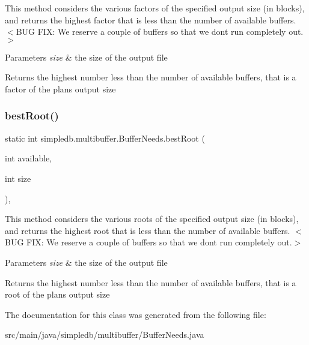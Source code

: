 This method considers the various factors of the specified output size (in blocks), and returns the highest factor that is less than the number of available buffers. $<$B\+UG F\+IX\+: We reserve a couple of buffers so that we don\textquotesingle{}t run completely out.$>$ 
\begin{DoxyParams}{Parameters}
{\em size} & the size of the output file \\
\hline
\end{DoxyParams}
\begin{DoxyReturn}{Returns}
the highest number less than the number of available buffers, that is a factor of the plan\textquotesingle{}s output size 
\end{DoxyReturn}
\mbox{\label{classsimpledb_1_1multibuffer_1_1BufferNeeds_ab3eff09df8f5c079b69df4a2939d7545}} 
\subsubsection{\texorpdfstring{best\+Root()}{bestRoot()}}
{\footnotesize\ttfamily static int simpledb.\+multibuffer.\+Buffer\+Needs.\+best\+Root (\begin{DoxyParamCaption}\item[{int}]{available,  }\item[{int}]{size }\end{DoxyParamCaption})\hspace{0.3cm}{\ttfamily [inline]}, {\ttfamily [static]}}

This method considers the various roots of the specified output size (in blocks), and returns the highest root that is less than the number of available buffers. $<$B\+UG F\+IX\+: We reserve a couple of buffers so that we don\textquotesingle{}t run completely out.$>$ 
\begin{DoxyParams}{Parameters}
{\em size} & the size of the output file \\
\hline
\end{DoxyParams}
\begin{DoxyReturn}{Returns}
the highest number less than the number of available buffers, that is a root of the plan\textquotesingle{}s output size 
\end{DoxyReturn}


The documentation for this class was generated from the following file\+:\begin{DoxyCompactItemize}
\item 
src/main/java/simpledb/multibuffer/Buffer\+Needs.\+java\end{DoxyCompactItemize}
